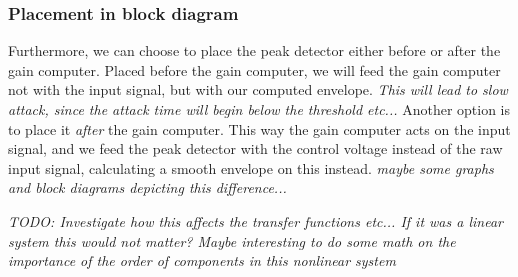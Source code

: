 \subsubsection{Placement in block diagram}
Furthermore, we can choose to place the peak detector either before or after the gain computer. Placed before the gain computer, we will feed the gain computer not with the input signal, but with our computed envelope. \emph{This will lead to slow attack, since the attack time will begin below the threshold etc...}
Another option is to place it \emph{after} the gain computer. This way the gain computer acts on the input signal, and we feed the peak detector with the control voltage instead of the raw input signal, calculating a smooth envelope on this instead. \emph{maybe some graphs and block diagrams depicting this difference...}

\emph{TODO: Investigate how this affects the transfer functions etc... If it was a linear system this would not matter? Maybe interesting to do some math on the importance of the order of components in this nonlinear system}

